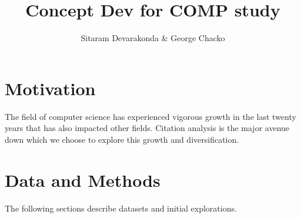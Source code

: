 \documentclass[11pt, oneside]{article}   	%
\title{Concept Dev for COMP study}
\author{Sitaram Devarakonda \& George Chacko}
\begin{document}
\maketitle
\section{Motivation} The field of computer science has experienced vigorous growth in the last twenty years that has also impacted other fields. Citation analysis is the major avenue down which we choose to explore this growth and diversification.

\section{Data and Methods} The following sections describe datasets and initial explorations.
\end{document}
